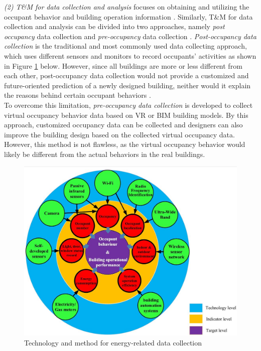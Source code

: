\documentclass[a4paper, oneside]{discothesis}
\begin{document}
			\textit{(2) T\&M for data collection and analysis} 
			focuses on obtaining and utilizing the occupant behavior and building operation information \cite{ZOU2018165}. Similarly, T\&M for data collection and analysis can be divided into two approaches, namely \textit{post occupancy} data collection and \textit{pre-occupancy} data collection \cite{ZOU2018165}. \textit{Post-occupancy data collection} is the traditional and most commonly used data collecting approach, which uses different sensors and monitors to record occupants' activities as shown in Figure \ref{fig:Energy_DataCollection} below. However, since all buildings are more or less different from each other, post-occupancy data collection would not provide a customized and future-oriented prediction of a newly designed building, neither would it explain the reasons behind certain occupant behaviors \cite{NIU2016275}.\\

			To overcome this limitation, \textit{pre-occupancy data collection} is developed to collect virtual occupancy behavior data based on VR or BIM building models. By this approach, customized occupancy data can be collected and designers can also improve the building design based on the collected virtual occupancy data. However, this method is not flawless, as the virtual occupancy behavior would likely be different from the actual behaviors in the real buildings.\\


			\begin{figure}[h!]
			\centering
			\includegraphics[scale=0.5]{Energy-relatedData.jpg}
			\caption{Technology and method for energy-related data collection \cite{jia2017occupancy}}
			\label{fig:Energy_DataCollection}
			\end{figure}
\end{document}
